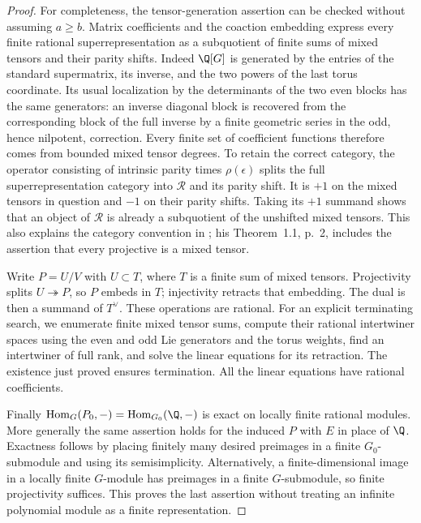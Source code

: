 \begin{proof}
For completeness, the tensor-generation assertion can be checked
without assuming $a\geq b$.  Matrix coefficients and the coaction
embedding express every finite rational superrepresentation as a
subquotient of finite sums of mixed tensors and their parity shifts.
Indeed $\Q[G]$ is generated by the entries of the standard
supermatrix, its inverse, and the two powers of the last torus
coordinate.  Its usual localization by the determinants of the two
even blocks has the same generators: an inverse diagonal block is
recovered from the corresponding block of the full inverse by a
finite geometric series in the odd, hence nilpotent, correction.
Every finite set of coefficient functions therefore comes from
bounded mixed tensor degrees.  To retain the correct category,
the operator consisting of intrinsic parity times $\rho(\epsilon)$
splits the full superrepresentation category into $\mathcal R$ and
its parity shift.  It is $+1$ on the mixed tensors in question and
$-1$ on their parity shifts.  Taking its $+1$ summand shows that an
object of $\mathcal R$ is already a subquotient of the unshifted
mixed tensors.  This also explains the category convention in
\citet[section~2, pp.~3--4]{c_heidersdorf2017mixed};
his Theorem~1.1, p.~2, includes the assertion that every projective
is a mixed tensor.

Write $P=U/V$ with $U\subset T$, where $T$ is a finite sum of mixed
tensors.  Projectivity splits $U\twoheadrightarrow P$, so $P$
embeds in $T$; injectivity retracts that embedding.  The dual is
then a summand of $T^\vee$.  These operations are rational.  For an
explicit terminating search, we enumerate finite mixed tensor sums,
compute their rational intertwiner spaces using the even and odd
Lie generators and the torus weights, find an intertwiner of full
rank, and solve the linear equations for its retraction.  The
existence just proved ensures termination.  All the linear
equations have rational coefficients.

Finally $\operatorname{Hom}_{G}(P_0,-)=
\operatorname{Hom}_{G_0}(\Q,-)$ is exact on locally finite rational
modules.  More generally the same assertion holds for the induced
$P$ with $E$ in place of $\Q$.  Exactness follows by placing
finitely many desired preimages in a finite $G_0$-submodule and
using its semisimplicity.  Alternatively, a finite-dimensional
image in a locally finite $G$-module has preimages in a finite
$G$-submodule, so finite projectivity suffices.  This proves the
last assertion without treating an infinite polynomial module as
a finite representation.
\end{proof}

